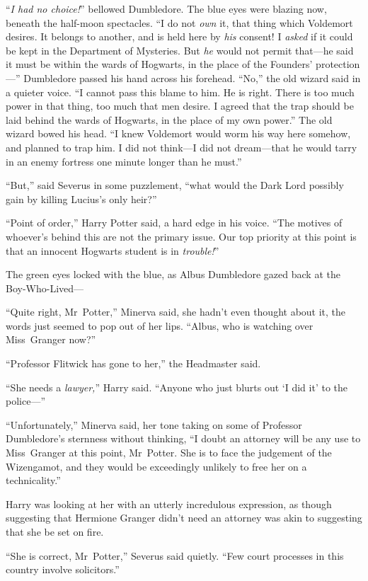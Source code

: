 “\emph{I had no choice!}” bellowed Dumbledore. The blue eyes were blazing now, beneath the half-moon spectacles. “I do not \emph{own} it, that thing which Voldemort desires. It belongs to another, and is held here by \emph{his} consent! I \emph{asked} if it could be kept in the Department of Mysteries. But \emph{he} would not permit that—he said it must be within the wards of Hogwarts, in the place of the Founders’ protection—” Dumbledore passed his hand across his forehead. “No,” the old wizard said in a quieter voice. “I cannot pass this blame to him. He is right. There is too much power in that thing, too much that men desire. I agreed that the trap should be laid behind the wards of Hogwarts, in the place of my own power.” The old wizard bowed his head. “I knew Voldemort would worm his way here somehow, and planned to trap him. I did not think—I did not dream—that he would tarry in an enemy fortress one minute longer than he must.”

“But,” said Severus in some puzzlement, “what would the Dark Lord possibly gain by killing Lucius’s only heir?”

“Point of order,” Harry Potter said, a hard edge in his voice. “The motives of whoever’s behind this are not the primary issue. Our top priority at this point is that an innocent Hogwarts student is in \emph{trouble!}”

The green eyes locked with the blue, as Albus Dumbledore gazed back at the Boy-Who-Lived—

“Quite right, Mr~Potter,” Minerva said, she hadn’t even thought about it, the words just seemed to pop out of her lips. “Albus, who is watching over Miss~Granger now?”

“Professor Flitwick has gone to her,” the Headmaster said.

“She needs a \emph{lawyer,}” Harry said. “Anyone who just blurts out ‘I did it’ to the police—”

“Unfortunately,” Minerva said, her tone taking on some of Professor Dumbledore’s sternness without thinking, “I doubt an attorney will be any use to Miss~Granger at this point, Mr~Potter. She is to face the judgement of the Wizengamot, and they would be exceedingly unlikely to free her on a technicality.”

Harry was looking at her with an utterly incredulous expression, as though suggesting that Hermione Granger didn’t need an attorney was akin to suggesting that she be set on fire.

“She is correct, Mr~Potter,” Severus said quietly. “Few court processes in this country involve solicitors.”

